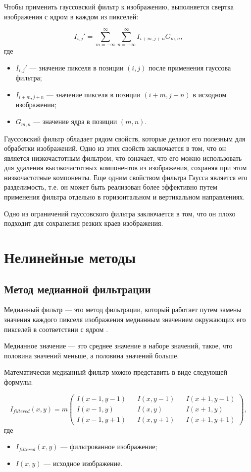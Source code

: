Чтобы применить гауссовский фильтр к изображению, выполняется свертка изображения с ядром в каждом из пикселей:

\begin{equation}
I_{i,j}' = \sum_{m=-\infty}^{\infty} \sum_{n=-\infty}^{\infty} I_{i+m,j+n} G_{m,n},
\end{equation}
где 
\begin{itemize}
    \item $I_{i,j}'$ --- значение пикселя в позиции $(i,j)$ после применения гауссова фильтра;
    \item $I_{i+m,j+n}$ --- значение пикселя в позиции $(i+m,j+n)$ в исходном изображении;
    \item $G_{m,n}$ --- значение ядра в позиции $(m,n)$.
\end{itemize}

Гауссовский фильтр обладает рядом свойств, которые делают его полезным для обработки изображений. Одно из этих свойств заключается в том, что он является низкочастотным фильтром, что означает, что его можно использовать для удаления высокочастотных компонентов из изображения, сохраняя при этом низкочастотные компоненты. Еще одним свойством фильтра Гаусса является его разделимость, т.е. он может быть реализован более эффективно путем применения фильтра отдельно в горизонтальном и вертикальном направлениях.

Одно из ограничений гауссовского фильтра заключается в том, что он плохо подходит для сохранения резких краев изображения.

\section{Нелинейные методы}

\subsection{Метод медианной фильтрации}

Медианный фильтр --- это метод фильтрации, который работает путем замены значения каждого пикселя изображения медианным значением окружающих его пикселей в соответствии с ядром \cite{medianfilter}. 

Медианное значение --- это среднее значение в наборе значений, такое, что половина значений меньше, а половина значений больше.

Математически медианный фильтр можно представить в виде следующей формулы:

\begin{equation}
    I_{filtered}(x,y) = m   \begin{pmatrix}
I(x-1,y-1) && I(x,y-1) && I(x+1,y-1) \\
I(x-1,y) && I(x,y) && I(x+1,y) \\
I(x-1,y+1) && I(x,y+1) && I(x+1,y+1)
\end{pmatrix},
\end{equation}
где
\begin{itemize}
    \item $I_{filtered}(x,y)$ --- фильтрованное изображение;
    \item $I(x,y)$ --- исходное изображение.
\end{itemize}

